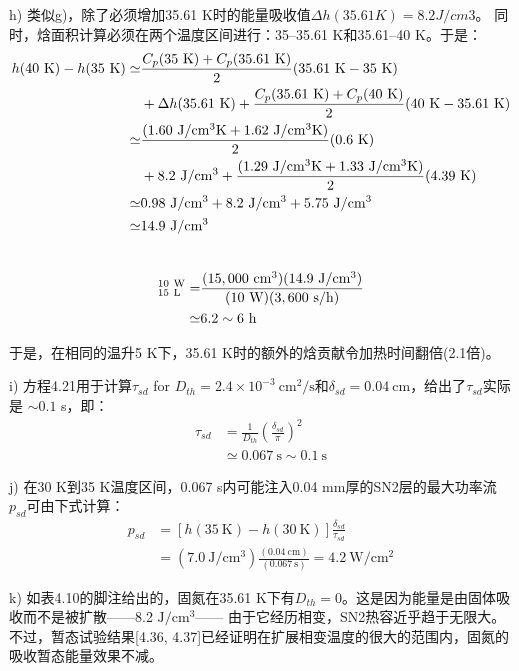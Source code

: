 h) 类似g)，除了必须增加35.61 K时的能量吸收值$\Delta h(35.61 K)=8.2 J/cm3$。
同时，焓面积计算必须在两个温度区间进行：35–35.61 K和35.61–40 K。于是：
\begin{align*}%
h(40\ \mathrm{K})-h(35\ \mathrm{K})\simeq&\frac{C_p(35\ \mathrm{K})+C_p(35.61\ \mathrm{K})}{2}(35.61\ \mathrm{K}-35\ \mathrm{K}) \\\notag
&+\Delta h(35.61\ \mathrm{K})+\frac{C_p(35.61\ \mathrm{K})+C_p(40\ \mathrm{K})}{2}(40\ \mathrm{K}-35.61\ \mathrm{K})\\\notag
\simeq&\frac{(1.60\ \mathrm{J/cm^3 K}+1.62\ \mathrm{J/cm^3 K})}{2}(0.6\ \mathrm{K})\\\notag
&+8.2\ \mathrm{J/cm^3}+\frac{(1.29\ \mathrm{J/cm^3 K}+1.33\ \mathrm{J/cm^3 K})}{2}(4.39\ \mathrm{K})\\\notag
\simeq&0.98\ \mathrm{J/cm^3}+8.2\ \mathrm{J/cm^3}+5.75\ \mathrm{J/cm^3}\\\notag
\simeq& 14.9\ \mathrm{J/cm^3}\\\notag
\end{align*}

\begin{align*}
[\Delta t(30\ \mathrm{K} \rightarrow 35\ \mathrm{K})]_{15\ \mathrm{L}}^{10\ \mathrm{W}}=&\frac{(15,000\ \mathrm{cm^3})(14.9\ \mathrm{J/cm^3})}{(10\ \mathrm{W})(3,600\ \mathrm{s/h})}\\\notag
\simeq&6.2\sim 6\ \mathrm{h} \notag
\end{align*}

于是，在相同的温升5 K下，35.61 K时的额外的焓贡献令加热时间翻倍(2.1倍)。

i) 方程4.21用于计算$\tau_{sd}$ for $D_{th} = 2.4\times 10^{−3} \ \mathrm{cm^2/s}$和$\delta_{sd}=0.04\ \mathrm{cm}$，给出了$\tau_{sd}$实际是 $\sim 0.1$ s，即：
\begin{align*}%
\tau_{sd}&=\frac{1}{D_{th}}(\frac{\delta_{sd}}{\pi})^2 \\\tag{4.21}
&\simeq 0.067\ \mathrm{s}\sim 0.1\ \mathrm{s}
\end{align*}

j) 在30 K到35 K温度区间，0.067 s内可能注入0.04 mm厚的SN2层的最大功率流$p_{sd}$可由下式计算：
\begin{align*}%
p_{sd}&=[h(35\ \mathrm{K})-h(30\ \mathrm{K})]\frac{\delta_{sd}}{\tau_{sd}}\\
&=(7.0\ \mathrm{J/cm^3})\frac{(0.04\ \mathrm{cm})}{(0.067\ \mathrm{s})}=4.2 \ \mathrm{W/cm^2}
\end{align*}

k) 如表4.10的脚注给出的，固氮在35.61 K下有$D_{th} = 0$。这是因为能量是由固体吸收而不是被扩散——8.2 $\mathrm{J/cm^3}$——
由于它经历相变，SN2热容近乎趋于无限大。
不过，暂态试验结果[4.36, 4.37]已经证明在扩展相变温度的很大的范围内，固氮的吸收暂态能量效果不减。

